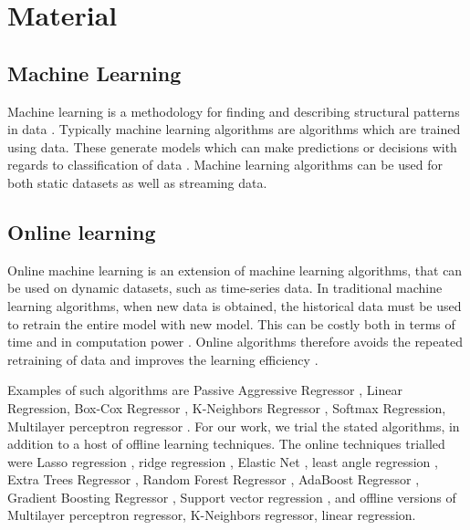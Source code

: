 \documentclass[final,3p,times,twocolumn,numbers]{elsarticle}
\begin{document}
\section{Material}
\label{sec:material}

\subsection{Machine Learning}

Machine learning is a methodology for finding and describing structural patterns in data \cite{Witten2011}. Typically machine learning algorithms are algorithms which are trained using data. These generate models which can make predictions or decisions with regards to classification of data \cite{Johansson2017}. Machine learning algorithms can be used for both static datasets as well as streaming data.




\subsection{Online learning}

Online machine learning is an extension of machine learning algorithms, that can be used on dynamic datasets, such as time-series data. In traditional machine learning algorithms, when new data is obtained, the historical data must be used to retrain the entire model with new model. This can be costly both in terms of time and in computation power \cite{Li2016}. Online algorithms therefore  avoids the repeated retraining of data and improves the learning efficiency \cite{Rong2009}.

Examples of such algorithms are Passive Aggressive Regressor \cite{Gzik2014}, Linear Regression, Box-Cox Regressor \cite{Box1964}, K-Neighbors Regressor \cite{forgy65}, Softmax Regression, Multilayer perceptron regressor \cite{Hinton1989}. For our work, we trial the stated algorithms, in addition to a host of offline learning techniques. The online techniques trialled were Lasso regression \cite{Tibshirani1996a}, ridge regression \cite{GeladiPaul1994Mrac},  Elastic Net \cite{Geostatistics2010}, least angle regression \cite{Fike1988}, Extra Trees Regressor \cite{Fike1988}, Random Forest Regressor \cite{Breiman2001}, AdaBoost Regressor \cite{Freund1997}, Gradient Boosting Regressor \cite{316}, Support vector regression \cite{Cortes1995}, and offline versions of Multilayer perceptron regressor, K-Neighbors regressor, linear regression.
\end{document}
